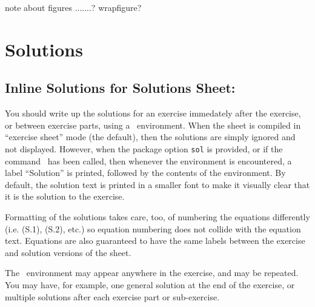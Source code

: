 \documentclass[11pt,a4paper]{article}
\begin{document}
note about figures .......?
wrapfigure?


\section{Solutions}
\label{sec:Solutions}

\subsection{Inline Solutions for Solutions Sheet: }

You should write up the solutions for an exercise immedately after the exercise, or
between exercise parts, using
a~ environment. When the sheet is compiled in ``exercise sheet'' mode
(the default), then the solutions are simply ignored and not displayed. However, when the
package option {\tt sol} is provided, or if the command~
has been called, then whenever the environment  is encountered, a label
``Solution'' is printed, followed by the contents of the environment. By default, the
solution text is printed in a smaller font to make it visually clear that it is the
solution to the exercise.

Formatting of the solutions takes care, too, of numbering the equations differently
(i.e. (S.1), (S.2), etc.) so equation numbering does not collide with the equation
text. Equations are also guaranteed to have the same
labels between the exercise and solution versions of the sheet.

The~ environment may appear anywhere in the exercise, and may be
repeated. You may have, for example, one general solution at the end of the exercise, or
multiple solutions after each exercise part or sub-exercise.

\end{document}
